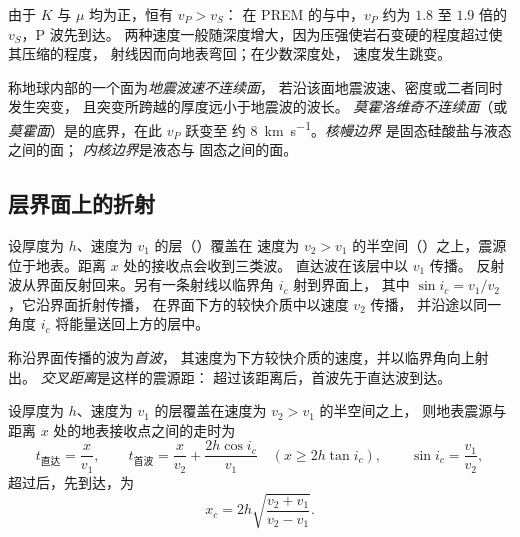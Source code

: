 由于 $K$ 与 $\mu$ 均为正，恒有 $v_P > v_S$：
在 PREM 的与中，$v_P$ 约为 $1.8$ 至 $1.9$ 倍的 $v_S$，P 波先到达。
两种速度一般随深度增大，因为压强使岩石变硬的程度超过使其压缩的程度，
射线因而向地表弯回；在少数深度处，
速度发生跳变。

\begin{definition}
\label{def:b1:layered-earth:discontinuity}
称地球内部的一个面为\emph{地震波速不连续面}，
若沿该面地震波速、密度或二者同时发生突变，
且突变所跨越的厚度远小于地震波的波长。
\emph{莫霍洛维奇不连续面}（或
\emph{莫霍面}）是的底界，在此 $v_P$ 跃变至
约 \qty{8}{km.s^{-1}}。\emph{核幔边界}
是固态硅酸盐与液态之间的面；
\emph{内核边界}是液态与
固态之间的面。
\end{definition}

\subsection{层界面上的折射}

设厚度为 $h$、速度为 $v_1$ 的层（）覆盖在
速度为 $v_2 > v_1$ 的半空间（）之上，震源位于地表。距离 $x$ 处的接收点会收到三类波。
直达波在该层中以 $v_1$ 传播。
反射波从界面反射回来。另有一条射线以临界角 $i_c$ 射到界面上，
其中 $\sin i_c = v_1/v_2$，它沿界面折射传播，
在界面下方的较快介质中以速度 $v_2$ 传播，
并沿途以同一角度 $i_c$ 将能量送回上方的层中。

\begin{definition}[首波、交叉距离]\label{def:b1:layered-earth:head-wave}
称沿界面传播的波为\emph{首波}，
其速度为下方较快介质的速度，并以临界角向上射出。
\emph{交叉距离}是这样的震源距：
超过该距离后，首波先于直达波到达。
\end{definition}

\begin{theorem}[双层地球中的走时]\label{thm:b1:layered-earth:two-layer}
设厚度为 $h$、速度为 $v_1$ 的层覆盖在速度为 $v_2 > v_1$ 的半空间之上，
则地表震源与距离 $x$ 处的地表接收点之间的走时为
\[
  t_{\text{直达}} = \frac{x}{v_1}, \qquad
  t_{\text{首波}} = \frac{x}{v_2} + \frac{2h\cos i_c}{v_1}
  \quad (x \ge 2h\tan i_c), \qquad \sin i_c = \frac{v_1}{v_2},
\]
超过后，先到达，为
\[
  x_c = 2h\sqrt{\frac{v_2 + v_1}{v_2 - v_1}}.
\]
\end{theorem}


